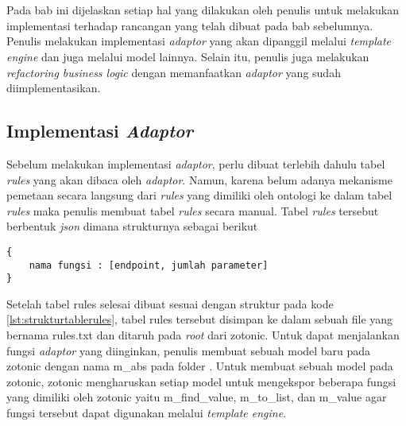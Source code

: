 \chapter{\babEmpat}

Pada bab ini dijelaskan setiap hal yang dilakukan oleh penulis untuk melakukan implementasi terhadap rancangan yang telah dibuat pada bab sebelumnya. Penulis melakukan implementasi \textit{adaptor} yang akan dipanggil melalui \textit{template engine} dan juga melalui model lainnya. Selain itu, penulis juga melakukan \textit{refactoring business logic} dengan memanfaatkan \textit{adaptor} yang sudah diimplementasikan.

\section{Implementasi \textit{Adaptor}}
Sebelum melakukan implementasi \textit{adaptor}, perlu dibuat terlebih dahulu tabel \textit{rules} yang akan dibaca oleh \textit{adaptor}. Namun, karena belum adanya mekanisme pemetaan secara langsung dari \textit{rules} yang dimiliki oleh ontologi ke dalam tabel \textit{rules} maka penulis membuat tabel \textit{rules} secara manual. Tabel \textit{rules} tersebut berbentuk \textit{json} dimana strukturnya sebagai berikut

\begin{minipage}{\linewidth}
\begin{lstlisting}[caption={Struktur tabel \textit{rules}},label={lst:strukturtablerules}]
{
	nama fungsi : [endpoint, jumlah parameter]
}
\end{lstlisting}
\end{minipage}

Setelah tabel rules selesai dibuat sesuai dengan struktur pada kode \ref{lst:strukturtablerules}, tabel rules tersebut disimpan ke dalam sebuah file yang bernama rules.txt dan ditaruh pada \textit{root} dari zotonic. Untuk dapat menjalankan fungsi \textit{adaptor} yang diinginkan, penulis membuat sebuah model baru pada zotonic dengan nama m\_abs pada folder . Untuk membuat sebuah model pada zotonic, zotonic mengharuskan setiap model untuk mengekspor beberapa fungsi yang dimiliki oleh zotonic yaitu m\_find\_value, m\_to\_list, dan m\_value agar fungsi tersebut dapat digunakan melalui \textit{template engine}.

